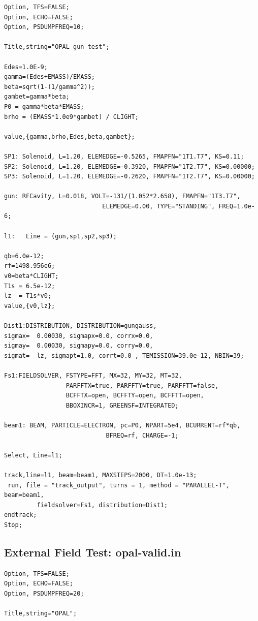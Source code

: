 \documentclass{psi-note}    %
\begin{document}
{\begin{verbatim}
Option, TFS=FALSE;
Option, ECHO=FALSE;
Option, PSDUMPFREQ=10;

Title,string="OPAL gun test";

Edes=1.0E-9;
gamma=(Edes+EMASS)/EMASS;
beta=sqrt(1-(1/gamma^2));
gambet=gamma*beta;
P0 = gamma*beta*EMASS;
brho = (EMASS*1.0e9*gambet) / CLIGHT;

value,{gamma,brho,Edes,beta,gambet};

SP1: Solenoid, L=1.20, ELEMEDGE=-0.5265, FMAPFN="1T1.T7", KS=0.11;
SP2: Solenoid, L=1.20, ELEMEDGE=-0.3920, FMAPFN="1T2.T7", KS=0.00000;
SP3: Solenoid, L=1.20, ELEMEDGE=-0.2620, FMAPFN="1T2.T7", KS=0.00000;

gun: RFCavity, L=0.018, VOLT=-131/(1.052*2.658), FMAPFN="1T3.T7", 
                           ELEMEDGE=0.00, TYPE="STANDING", FREQ=1.0e-6;

l1:   Line = (gun,sp1,sp2,sp3); 

qb=6.0e-12;
rf=1498.956e6;
v0=beta*CLIGHT;
T1s = 6.5e-12;
lz  = T1s*v0;
value,{v0,lz};

Dist1:DISTRIBUTION, DISTRIBUTION=gungauss,
sigmax=  0.00030, sigmapx=0.0, corrx=0.0,
sigmay=  0.00030, sigmapy=0.0, corry=0.0,
sigmat=  lz, sigmapt=1.0, corrt=0.0 , TEMISSION=39.0e-12, NBIN=39;

Fs1:FIELDSOLVER, FSTYPE=FFT, MX=32, MY=32, MT=32, 
                 PARFFTX=true, PARFFTY=true, PARFFTT=false,
                 BCFFTX=open, BCFFTY=open, BCFFTT=open, 
                 BBOXINCR=1, GREENSF=INTEGRATED;

beam1: BEAM, PARTICLE=ELECTRON, pc=P0, NPART=5e4, BCURRENT=rf*qb, 
                            BFREQ=rf, CHARGE=-1;

Select, Line=l1;

track,line=l1, beam=beam1, MAXSTEPS=2000, DT=1.0e-13;
 run, file = "track_output", turns = 1, method = "PARALLEL-T", beam=beam1, 
         fieldsolver=Fs1, distribution=Dist1;
endtrack;
Stop;
\end{verbatim}

\subsection{External Field Test: opal-valid.in} \label{app:extftest}

\begin{verbatim}
Option, TFS=FALSE;
Option, ECHO=FALSE;
Option, PSDUMPFREQ=20;

Title,string="OPAL";


\end{verbatim}}
\end{document}
